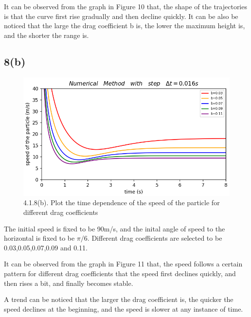 \documentclass{article}
\begin{document}
It can be observed from the graph in Figure 10 that, the shape of the trajectories is that the curve first rise gradually and then decline quickly.
It can be also be noticed that the large the drag coefficient b is, the lower the maximum height is, and the shorter the range is.

\vspace{0.01\textheight}
\subsection*{8(b)}
\begin{figure}[H]
  \centering
  \includegraphics[scale=0.4]{./graphs/project4.1.8(b).png}
  \caption{4.1.8(b). Plot the time dependence of the speed of the particle for different drag coefficients}
\end{figure}
The initial speed is fixed to be 90m/s, and the inital angle of speed to the horizontal is fixed to be {$\pi/6$}.
Different drag coefficients are selected to be 0.03,0.05,0.07,0.09 and 0.11.

It can be observed from the graph in Figure 11 that, the speed follows a certain pattern for different drag coefficients that the speed first declines quickly, and then rises a bit, and finally becomes stable.

A trend can be noticed that the larger the drag coefficient is, the quicker the speed declines at the beginning, and the speed is slower at any instance of time.

\vspace{0.02\textheight}
\end{document}

